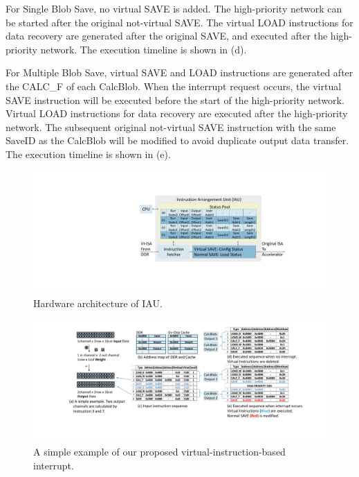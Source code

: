 For Single Blob Save, no virtual SAVE is added. The high-priority network can be started after the original not-virtual SAVE. The virtual LOAD instructions for data recovery are generated after the original SAVE, and executed after the high-priority network. The execution timeline is shown in (d).

For Multiple Blob Save, virtual SAVE and LOAD instructions are generated after the CALC\_F of each CalcBlob. When the interrupt request occurs, the virtual SAVE instruction will be executed before the start of the high-priority network. Virtual LOAD instructions for data recovery are executed after the high-priority network. The subsequent original not-virtual SAVE instruction with the same SaveID as the CalcBlob will be modified to avoid duplicate output data transfer. The execution timeline is shown in (e).


\begin{figure}[t]
	\centering
	\includegraphics[width=0.99\linewidth]{fig/iau.pdf}
	\caption{Hardware architecture of IAU. 
	}
	\label{fig:IAU}
\end{figure}
\begin{figure}[t]
	\centering
	\includegraphics[width=0.99\linewidth]{fig/interexample.pdf}
	\caption{ A simple example of our proposed virtual-instruction-based interrupt. }
	\label{fig:interexample}
\end{figure}


